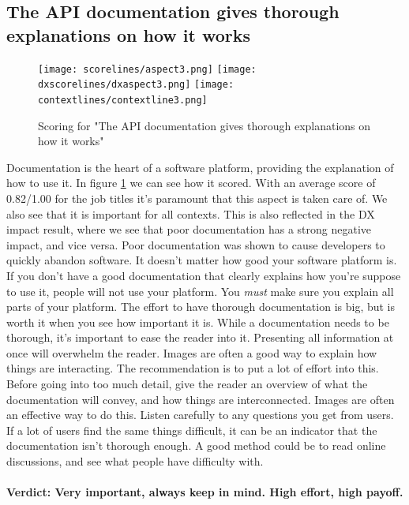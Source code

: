 \documentclass{cslthse-msc}
\begin{document}
    \subsection{The API documentation gives thorough explanations on how it works}
    \begin{figure}[H]
        \centering
        \texttt{[image: scorelines/aspect3.png]}
        \texttt{[image: dxscorelines/dxaspect3.png]}
        \texttt{[image: contextlines/contextline3.png]}
        \caption{Scoring for "The API documentation gives thorough explanations on how it works"}
        \label{fig:aspect3}
    \end{figure}
    Documentation is the heart of a software platform, providing the explanation of how to use it. In figure \ref{fig:aspect3} we can see how it scored. With an average score of 0.82/1.00 for the job titles it's paramount that this aspect is taken care of. We also see that it is important for all contexts. This is also reflected in the DX impact result, where we see that poor documentation has a strong negative impact, and vice versa. Poor documentation was shown to cause developers to quickly abandon software. It doesn't matter how good your software platform is. If you don't have a good documentation that clearly explains how you're suppose to use it, people will not use your platform. You \textit{must} make sure you explain all parts of your platform. The effort to have thorough documentation is big, but is worth it when you see how important it is. While a documentation needs to be thorough, it's important to ease the reader into it. Presenting all information at once will overwhelm the reader. Images are often a good way to explain how things are interacting. The recommendation is to put a lot of effort into this. Before going into too much detail, give the reader an overview of what the documentation will convey, and how things are interconnected. Images are often an effective way to do this. Listen carefully to any questions you get from users. If a lot of users find the same things difficult, it can be an indicator that the documentation isn't thorough enough. A good method could be to read online discussions, and see what people have difficulty with.\\ \\
    \textbf{Verdict: Very important, always keep in mind. High effort, high payoff.}
\end{document}

